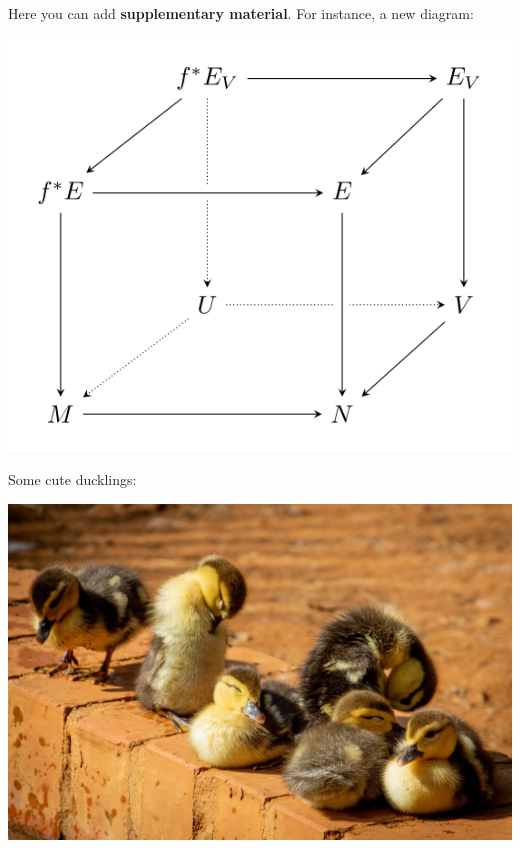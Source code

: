 \documentclass[fleqn,landscape]{betterposter}
\begin{document}
{  Here you can add \textbf{supplementary material}. For instance, a new diagram:
  \begin{center}
    \includegraphics[width=\textwidth]{img/tikzexample2}
  \end{center}

  Some cute ducklings:
  \begin{center}
    \includegraphics[width=\textwidth]{img/ducklings}
  \end{center}
}
\end{document}
